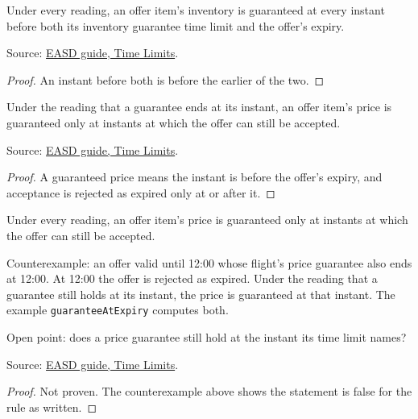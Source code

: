 \begin{theorem}
  \label{thm:offers-inventory-guaranteed-before}
  Under every reading, an offer item's inventory is guaranteed at every
  instant before both its inventory guarantee time limit and the offer's
  expiry.

  Source: \href{https://standards.atlassian.net/wiki/spaces/EASD/pages/574423066/Time+Limits}{EASD guide, Time Limits}.
\end{theorem}
\begin{proof}
  An instant before both is before the earlier of the two.
\end{proof}

\begin{theorem}
  \label{thm:offers-guarantee-exclusive-acceptable}
  Under the reading that a guarantee ends at its instant, an offer item's
  price is guaranteed only at instants at which the offer can still be
  accepted.

  Source: \href{https://standards.atlassian.net/wiki/spaces/EASD/pages/574423066/Time+Limits}{EASD guide, Time Limits}.
\end{theorem}
\begin{proof}
  A guaranteed price means the instant is before the offer's expiry, and
  acceptance is rejected as expired only at or after it.
\end{proof}

\begin{theorem}
  \label{thm:offers-guaranteed-while-acceptable}
  Under every reading, an offer item's price is guaranteed only at instants
  at which the offer can still be accepted.

  Counterexample: an offer valid until 12:00 whose flight's price guarantee
  also ends at 12:00. At 12:00 the offer is rejected as expired. Under the
  reading that a guarantee still holds at its instant, the price is
  guaranteed at that instant. The example \texttt{guaranteeAtExpiry}
  computes both.

  Open point: does a price guarantee still hold at the instant its time
  limit names?

  Source: \href{https://standards.atlassian.net/wiki/spaces/EASD/pages/574423066/Time+Limits}{EASD guide, Time Limits}.
\end{theorem}
\begin{proof}
  Not proven. The counterexample above shows the statement is false for the
  rule as written.
\end{proof}

